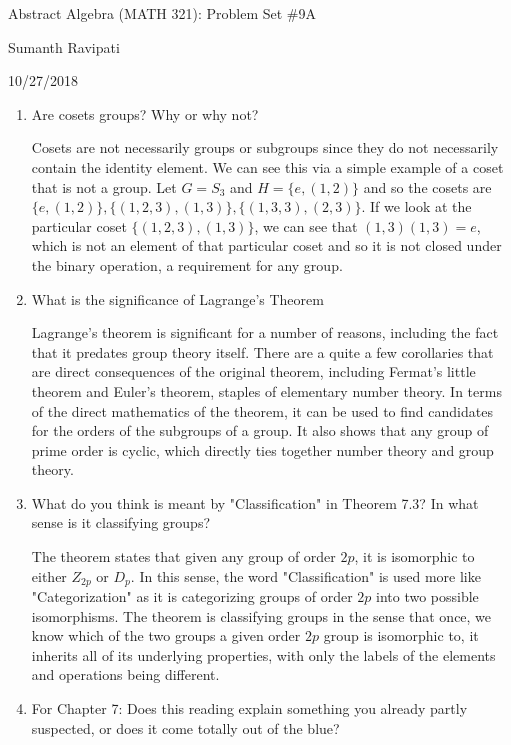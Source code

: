 \documentclass{article}
\begin{document}
%
\centerline{\Large Abstract Algebra (MATH 321): Problem Set \#9A}
\centerline{Sumanth Ravipati}
\centerline{10/27/2018}

\begin{enumerate}
    \item Are cosets groups? Why or why not?
    \begin{flushleft}
    Cosets are not necessarily groups or subgroups since they do not necessarily contain the identity element. We can see this via a simple example of a coset that is not a group. Let $G = S_3$ and $H = \{ e, (1,2) \}$ and so the cosets are $\{ e, (1,2) \}, \{ (1,2,3), (1,3) \}, \{ (1, 3, 3), (2,3) \}$. If we look at the particular coset $\{ (1,2,3), (1,3) \}$, we can see that $(1,3)(1,3) = e$, which is not an element of that particular coset and so it is not closed under the binary operation, a requirement for any group.
    \end{flushleft}
    \item What is the significance of Lagrange's Theorem
    \begin{flushleft}
    Lagrange's theorem is significant for a number of reasons, including the fact that it predates group theory itself. There are a quite a few corollaries that are direct consequences of the original theorem, including Fermat's little theorem and Euler's theorem, staples of elementary number theory. In terms of the direct mathematics of the theorem, it can be used to find candidates for the orders of the subgroups of a group. It also shows that any group of prime order is cyclic, which directly ties together number theory and group theory.
    \end{flushleft}
    \item What do you think is meant by "Classification" in Theorem 7.3? In what sense is it classifying groups?
    \begin{flushleft}
    The theorem states that given any group of order $2p$, it is isomorphic to either $Z_{2p}$ or $D_p$. In this sense, the word "Classification" is used more like "Categorization" as it is categorizing groups of order $2p$ into two possible isomorphisms. The theorem is classifying groups in the sense that once, we know which of the two groups a given order $2p$ group is isomorphic to, it inherits all of its underlying properties, with only the labels of the elements and operations being different.
    \end{flushleft}
    \item For Chapter 7: Does this reading explain something you already partly suspected, or does it come totally out of the blue?

\end{enumerate}
\end{document}
